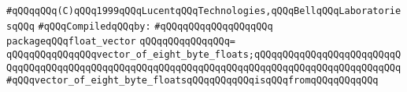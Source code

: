 \label{src/lib/std/float-vector.pkg}
\verb|#qQQqqQQq(C)qQQq1999qQQqLucentqQQqTechnologies,qQQqBellqQQqLaboratoriesqQQq|\newline
\newline
\verb|#qQQqCompiledqQQqby:|\newline
\verb|#qQQqqQQqqQQqqQQqqQQq|\newline
\newline
\verb|packageqQQqfloat_vector|\newline
\verb|qQQqqQQqqQQqqQQq=|\newline
\verb|qQQqqQQqqQQqqQQqvector_of_eight_byte_floats;qQQqqQQqqQQqqQQqqQQqqQQqqQQqqQQqqQQqqQQqqQQqqQQqqQQqqQQqqQQqqQQqqQQqqQQqqQQqqQQqqQQqqQQqqQQqqQQq#qQQqvector_of_eight_byte_floatsqQQqqQQqqQQqisqQQqfromqQQqqQQqqQQq|\newline

